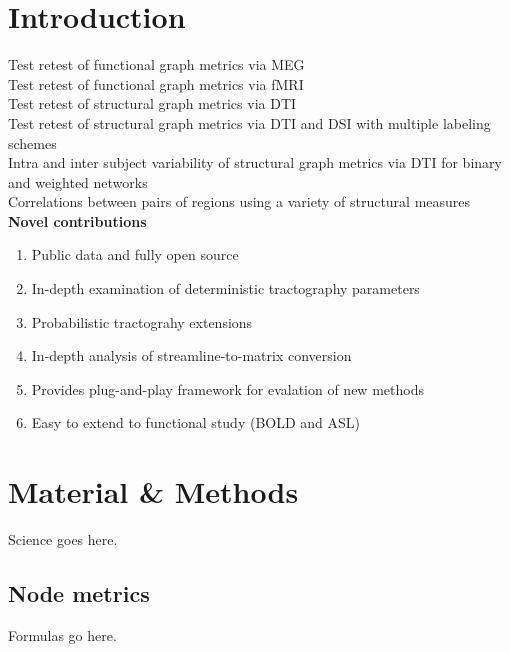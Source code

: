 \documentclass{frontiersSCNS} %
\begin{document}
\section{Introduction}

Test retest of functional graph metrics via MEG \cite{Deuker2009}\\
Test retest of functional graph metrics via fMRI \cite{Telesford2010}\\
Test retest of structural graph metrics via DTI \cite{Owen2013BC}\\ 
Test retest of structural graph metrics via DTI and DSI with multiple labeling schemes \cite{Bassett2011N}\\
Intra and inter subject variability of structural graph metrics via DTI for binary and weighted networks \cite{Cheng2012N}\\
Correlations between pairs of regions using a variety of structural measures \cite{Irimia2012N}\\

\textbf{Novel contributions}
\begin{enumerate}
\item Public data and fully open source
\item In-depth examination of deterministic tractography parameters
\item Probabilistic tractograhy extensions
\item In-depth analysis of streamline-to-matrix conversion
\item Provides plug-and-play framework for evalation of new methods
\item Easy to extend to functional study (BOLD and ASL) 
\end{enumerate}


\section{Material \& Methods}
Science goes here.\\

\subsection{Node metrics}
Formulas go here.
\end{document}

